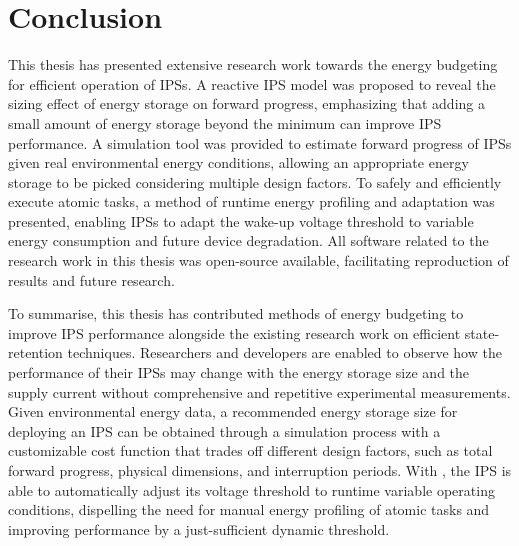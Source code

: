 \section{Conclusion}

This thesis has presented extensive research work towards the energy budgeting for efficient operation of IPSs.
A reactive IPS model was proposed to reveal the sizing effect of energy storage on forward progress, emphasizing that adding a small amount of energy storage beyond the minimum can improve IPS performance.
A simulation tool was provided to estimate forward progress of IPSs given real environmental energy conditions, allowing an appropriate energy storage to be picked considering multiple design factors. 
To safely and efficiently execute atomic tasks, a method of runtime energy profiling and adaptation was presented, enabling IPSs to adapt the wake-up voltage threshold to variable energy consumption and future device degradation.
All software related to the research work in this thesis was open-source available, facilitating reproduction of results and future research.

To summarise, this thesis has contributed methods of energy budgeting to improve IPS performance alongside the existing research work on efficient state-retention techniques. 
Researchers and developers are enabled to observe how the performance of their IPSs may change with the energy storage size and the supply current without comprehensive and repetitive experimental measurements. 
Given environmental energy data, a recommended energy storage size for deploying an IPS can be obtained through a simulation process with a customizable cost function that trades off different design factors, such as total forward progress, physical dimensions, and interruption periods. 
With \nn{}, the IPS is able to automatically adjust its voltage threshold to runtime variable operating conditions, dispelling the need for manual energy profiling of atomic tasks and improving performance by a just-sufficient dynamic threshold.
